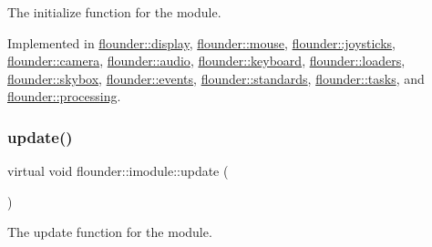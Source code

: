 The initialize function for the module. 



Implemented in \hyperlink{classflounder_1_1display_aa28a814bc8ba635c99aa4b707bac3259}{flounder\+::display}, \hyperlink{classflounder_1_1mouse_a8a550ad472e61ed74ca42c07777bdd1f}{flounder\+::mouse}, \hyperlink{classflounder_1_1joysticks_a6bb77cff38ccbdcdde66495afc538b1a}{flounder\+::joysticks}, \hyperlink{classflounder_1_1camera_a3deb0358c2a67ad864a630adaf566c4e}{flounder\+::camera}, \hyperlink{classflounder_1_1audio_acc0f4ebb4b42b0ef055ef8dd14f1a9da}{flounder\+::audio}, \hyperlink{classflounder_1_1keyboard_a624374ba5d79431171a44ed332e63322}{flounder\+::keyboard}, \hyperlink{classflounder_1_1loaders_af99df6ebe1886b87efbca82842be0d0d}{flounder\+::loaders}, \hyperlink{classflounder_1_1skybox_ad298f30a9e35657726bc8043a687cab7}{flounder\+::skybox}, \hyperlink{classflounder_1_1events_a3256dce85cd1a62a6126812dab9c4630}{flounder\+::events}, \hyperlink{classflounder_1_1standards_a74dd1bd0e18bc72d985073a0771790fc}{flounder\+::standards}, \hyperlink{classflounder_1_1tasks_a1527c16072936c764b990d3b9fd8786e}{flounder\+::tasks}, and \hyperlink{classflounder_1_1processing_a5c9545d8a02d836bc198982750f24f49}{flounder\+::processing}.

\mbox{\label{classflounder_1_1imodule_a9a53d48a46b5f6b16a92b2cd8503f74a}} 
\subsubsection{\texorpdfstring{update()}{update()}}
{\footnotesize\ttfamily virtual void flounder\+::imodule\+::update (\begin{DoxyParamCaption}{ }\end{DoxyParamCaption})\hspace{0.3cm}{\ttfamily [pure virtual]}}



The update function for the module. 



